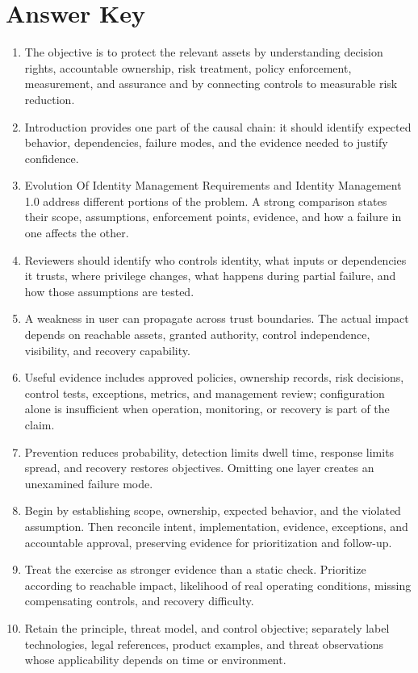\documentclass[11pt,letterpaper]{article}
\begin{document}
\section*{Answer Key}
\begin{enumerate}
\item The objective is to protect the relevant assets by understanding decision rights, accountable ownership, risk treatment, policy enforcement, measurement, and assurance and by connecting controls to measurable risk reduction.
\item Introduction provides one part of the causal chain: it should identify expected behavior, dependencies, failure modes, and the evidence needed to justify confidence.
\item Evolution Of Identity Management Requirements and Identity Management 1.0 address different portions of the problem. A strong comparison states their scope, assumptions, enforcement points, evidence, and how a failure in one affects the other.
\item Reviewers should identify who controls identity, what inputs or dependencies it trusts, where privilege changes, what happens during partial failure, and how those assumptions are tested.
\item A weakness in user can propagate across trust boundaries. The actual impact depends on reachable assets, granted authority, control independence, visibility, and recovery capability.
\item Useful evidence includes approved policies, ownership records, risk decisions, control tests, exceptions, metrics, and management review; configuration alone is insufficient when operation, monitoring, or recovery is part of the claim.
\item Prevention reduces probability, detection limits dwell time, response limits spread, and recovery restores objectives. Omitting one layer creates an unexamined failure mode.
\item Begin by establishing scope, ownership, expected behavior, and the violated assumption. Then reconcile intent, implementation, evidence, exceptions, and accountable approval, preserving evidence for prioritization and follow-up.
\item Treat the exercise as stronger evidence than a static check. Prioritize according to reachable impact, likelihood of real operating conditions, missing compensating controls, and recovery difficulty.
\item Retain the principle, threat model, and control objective; separately label technologies, legal references, product examples, and threat observations whose applicability depends on time or environment.
\end{enumerate}
\end{document}
